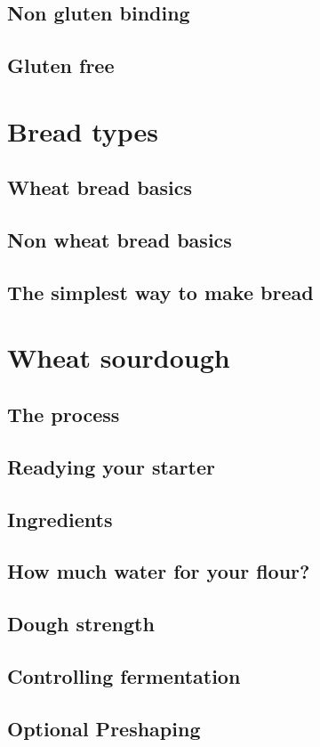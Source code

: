 \documentclass[a4paper, 12pt]{book}
\begin{document}
\section{Non gluten binding}
\section{Gluten free}

\chapter{Bread types}
\section{Wheat bread basics}
\section{Non wheat bread basics}
\section{The simplest way to make bread}

\chapter{Wheat sourdough}
\section{The process}
\section{Readying your starter}
\section{Ingredients}
\section{How much water for your flour?}
\section{Dough strength}
\section{Controlling fermentation}
\section{Optional Preshaping}
\end{document}
